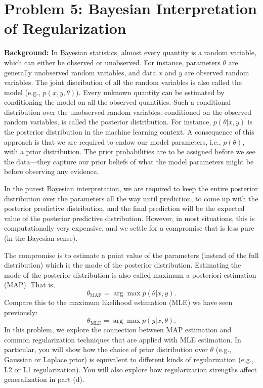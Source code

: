 \documentclass{article}
\begin{document}

\section*{Problem 5: Bayesian Interpretation of Regularization}

\textbf{Background:} In Bayesian statistics, almost every quantity is a random variable, which can either be observed or unobserved. For instance, parameters $\theta$ are generally unobserved random variables, and data $x$ and $y$ are observed random variables. The joint distribution of all the random variables is also called the model (e.g., $p(x, y, \theta)$). Every unknown quantity can be estimated by conditioning the model on all the observed quantities. Such a conditional distribution over the unobserved random variables, conditioned on the observed random variables, is called the posterior distribution. For instance, $p(\theta|x,y)$ is the posterior distribution in the machine learning context. A consequence of this approach is that we are required to endow our model parameters, i.e., $p(\theta)$, with a prior distribution. The prior probabilities are to be assigned before we see the data—they capture our prior beliefs of what the model parameters might be before observing any evidence.

In the purest Bayesian interpretation, we are required to keep the entire posterior distribution over the parameters all the way until prediction, to come up with the posterior predictive distribution, and the final prediction will be the expected value of the posterior predictive distribution. However, in most situations, this is computationally very expensive, and we settle for a compromise that is less pure (in the Bayesian sense).

The compromise is to estimate a point value of the parameters (instead of the full distribution) which is the mode of the posterior distribution. Estimating the mode of the posterior distribution is also called maximum a-posteriori estimation (MAP). That is,
\[
\theta_{\text{MAP}} = \arg\max p(\theta|x,y).
\]
Compare this to the maximum likelihood estimation (MLE) we have seen previously: 
\[
\theta_{\text{MLE}} = \arg\max p(y|x,\theta).
\]
In this problem, we explore the connection between MAP estimation and common regularization techniques that are applied with MLE estimation. In particular, you will show how the choice of prior distribution over $\theta$ (e.g., Gaussian or Laplace prior) is equivalent to different kinds of regularization (e.g., L2 or L1 regularization). You will also explore how regularization strengths affect generalization in part (d).
\end{document}

